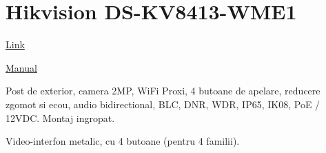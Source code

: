 \documentclass[12pt,english]{article}
\begin{document}
\section {Hikvision DS-KV8413-WME1}

\href{https://www.a2t.ro/videointerfon-wireless/videointerfon-full-hd-4-familii-control-acces-aplicat-tcp-ip-hikvision-ds-kv8413-wme1-s.html}{Link}

\href{https://www.hikvision.com/content/dam/hikvision/products/S000000001/S000000083/S000000129/S000000131/OFR000170/M000048926/User_Manual/UD20207B_Baseline_Video-Intercom-8-Series-Villa-Door-Station_User-Manual_V2.2.3.PDF}{Manual}


Post de exterior, camera 2MP, WiFi Proxi, 4 butoane de apelare, reducere zgomot si ecou, audio bidirectional, BLC, DNR, WDR, IP65, IK08, PoE / 12VDC. Montaj ingropat.

Video-interfon metalic, cu 4 butoane (pentru 4 familii).
\end{document}
